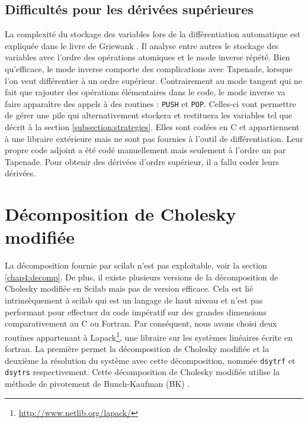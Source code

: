     \subsection{Difficult\'es pour les d\'eriv\'ees sup\'erieures}

La complexit\'e du stockage des variables lors de la diff\'erentiation automatique est expliqu\'ee dans le livre de Griewank
 \cite{Griewank2008EDP}. Il analyse entre autres le stockage des variables avec l'ordre des op\'erations atomiques et le 
mode inverse r\'ep\'et\'e. Bien qu'efficace, le mode inverse comporte des complications avec Tapenade,
 lorsque l'on veut diff\'erentier \`a un ordre sup\'erieur.
Contrairement au mode tangent qui ne fait que rajouter des op\'erations \'el\'ementaires dans le code, le mode inverse
va faire apparaître des appels \`a des routines : {\tt PUSH} et {\tt POP}. Celles-ci vont permettre de g\'erer une pile qui 
alternativement stockera et restituera les variables tel que d\'ecrit \`a la section \ref{subsection:strategies}. Elles sont cod\'ees en C et appartiennent 
\`a une libraire ext\'erieure mais ne sont pas fournies \`a l'outil de diff\'erentiation. Leur propre code adjoint a \'et\'e cod\'e manuellement
mais seulement \`a l'ordre un par Tapenade. Pour obtenir des d\'eriv\'ees d'ordre sup\'erieur, il a fallu coder leurs d\'eriv\'ees.





  \section{D\'ecomposition de Cholesky modifi\'ee}

\label{chap3:cholesky}

La d\'ecomposition fournie par scilab n'est pas exploitable, voir la section \ref{chap4:decomp}.
De plus, il existe plusieurs versions de la d\'ecomposition de Cholesky modifi\'ee en Scilab mais pas 
de version efficace. Cela est li\'e intrins\`equement \`a scilab qui est un langage de haut niveau et n'est pas performant pour effectuer du code
imp\'eratif sur des grandes dimensions comparativement au C ou Fortran.
Par cons\'equent, nous avons choisi deux routines appartenant \`a Lapack\footnote{\url{http://www.netlib.org/lapack/}}, une libraire sur les syst\`emes lin\'eaires \'ecrite en fortran.
 La premi\`ere permet la d\'ecomposition 
de Cholesky modifi\'ee et la deuxi\`eme la r\'esolution du syst\`eme avec cette d\'ecomposition, nomm\'ee {\tt dsytrf} et {\tt dsytrs} respectivement. 
Cette d\'ecomposition de Cholesky modifi\'ee utilise la m\'ethode de pivotement de Bunch-Kaufman (BK) \cite{Bunch}.

